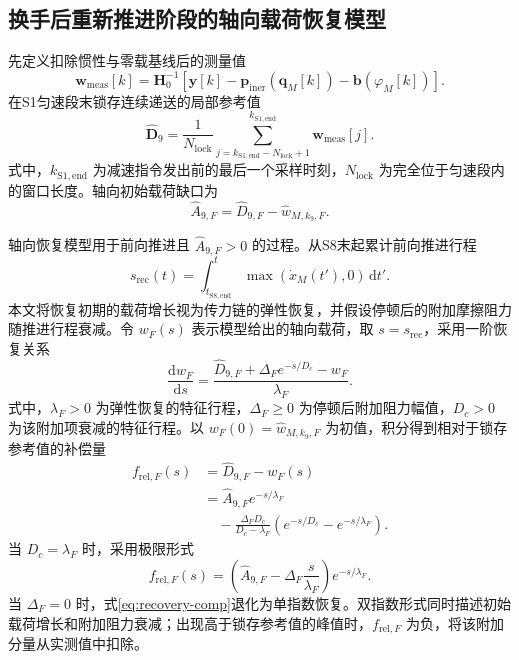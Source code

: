 \documentclass{JQRnew}
\providecommand{\RevisionColor}{\color{black}}
\newcommand{\revbegin}{\begingroup\RevisionColor}
\newcommand{\revend}{\par\endgroup}
\begin{document}
\revbegin
\subsection{换手后重新推进阶段的轴向载荷恢复模型}
\revend

\revbegin
先定义扣除惯性与零载基线后的测量值
\begin{equation}
\label{eq:corrected-measurement}
\bm w_{\mathrm{meas}}[k]=\bm H_0^{-1}\!\left[
\bm y[k]-\bm p_{\mathrm{iner}}(\bm q_M[k])-\bm b(\varphi_M[k])\right].
\end{equation}
在S1匀速段末锁存连续递送的局部参考值
\begin{equation}
\label{eq:lock}
\widehat{\bm D}_9=\frac{1}{N_{\mathrm{lock}}}
\sum_{j=k_{\mathrm{S1,end}}-N_{\mathrm{lock}}+1}^{k_{\mathrm{S1,end}}}
\bm w_{\mathrm{meas}}[j].
\end{equation}
式中，$k_{\mathrm{S1,end}}$ 为减速指令发出前的最后一个采样时刻，$N_{\mathrm{lock}}$ 为完全位于匀速段内的窗口长度。轴向初始载荷缺口为
\begin{equation}
\label{eq:deficit}
\widehat A_{9,F}=\widehat D_{9,F}-\widehat w_{M,k_9,F}.
\end{equation}
\revend

\revbegin
轴向恢复模型用于前向推进且 $\widehat A_{9,F}>0$ 的过程。从S8末起累计前向推进行程
\begin{equation}
\label{eq:recovery-travel}
s_{\mathrm{rec}}(t)=\int_{t_{\mathrm{S8,end}}}^{t}
\max\!\left(\dot x_M(t'),0\right)\,\mathrm dt'.
\end{equation}
本文将恢复初期的载荷增长视为传力链的弹性恢复，并假设停顿后的附加摩擦阻力随推进行程衰减。令 $w_F(s)$ 表示模型给出的轴向载荷，取 $s=s_{\mathrm{rec}}$，采用一阶恢复关系
\begin{equation}
\label{eq:recovery-ode}
\frac{\mathrm dw_F}{\mathrm ds}
=\frac{\widehat D_{9,F}+\Delta_F e^{-s/D_c}-w_F}{\lambda_F}.
\end{equation}
式中，$\lambda_F>0$ 为弹性恢复的特征行程，$\Delta_F\ge0$ 为停顿后附加阻力幅值，$D_c>0$ 为该附加项衰减的特征行程。以 $w_F(0)=\widehat w_{M,k_9,F}$ 为初值，积分得到相对于锁存参考值的补偿量
\begin{equation}
\label{eq:recovery-comp}
\begin{aligned}
f_{\mathrm{rel},F}(s)&=\widehat D_{9,F}-w_F(s)\\
&=\widehat A_{9,F}e^{-s/\lambda_F}\\
&\quad-\frac{\Delta_FD_c}{D_c-\lambda_F}
\left(e^{-s/D_c}-e^{-s/\lambda_F}\right).
\end{aligned}
\end{equation}
当 $D_c=\lambda_F$ 时，采用极限形式
\begin{equation}
\label{eq:equal-scales}
f_{\mathrm{rel},F}(s)=
\left(\widehat A_{9,F}-\Delta_F\frac{s}{\lambda_F}\right)e^{-s/\lambda_F}.
\end{equation}
当 $\Delta_F=0$ 时，式\eqref{eq:recovery-comp}退化为单指数恢复。双指数形式同时描述初始载荷增长和附加阻力衰减；出现高于锁存参考值的峰值时，$f_{\mathrm{rel},F}$ 为负，将该附加分量从实测值中扣除。
\revend
\end{document}
